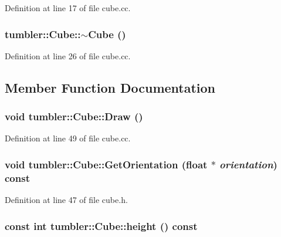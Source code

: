 Definition at line 17 of file cube.cc.

\hypertarget{classtumbler_1_1_cube_a7f17b53d8eeb3e0803e42904d4b16c88}{
\subsubsection[{$\sim$Cube}]{\setlength{\rightskip}{0pt plus 5cm}tumbler::Cube::$\sim$Cube ()}}
\label{classtumbler_1_1_cube_a7f17b53d8eeb3e0803e42904d4b16c88}


Definition at line 26 of file cube.cc.



\subsection{Member Function Documentation}
\hypertarget{classtumbler_1_1_cube_aa5004f01ce9403a31e1fb601efacfdde}{
\subsubsection[{Draw}]{\setlength{\rightskip}{0pt plus 5cm}void tumbler::Cube::Draw ()}}
\label{classtumbler_1_1_cube_aa5004f01ce9403a31e1fb601efacfdde}


Definition at line 49 of file cube.cc.

\hypertarget{classtumbler_1_1_cube_a2d995236d8986a916ad365c53bc54ad2}{
\subsubsection[{GetOrientation}]{\setlength{\rightskip}{0pt plus 5cm}void tumbler::Cube::GetOrientation (float $\ast$ {\em orientation}) const}}
\label{classtumbler_1_1_cube_a2d995236d8986a916ad365c53bc54ad2}


Definition at line 47 of file cube.h.

\hypertarget{classtumbler_1_1_cube_ab00828281d24db3ce0065cb52f253938}{
\subsubsection[{height}]{\setlength{\rightskip}{0pt plus 5cm}const int tumbler::Cube::height () const}}
\label{classtumbler_1_1_cube_ab00828281d24db3ce0065cb52f253938}


